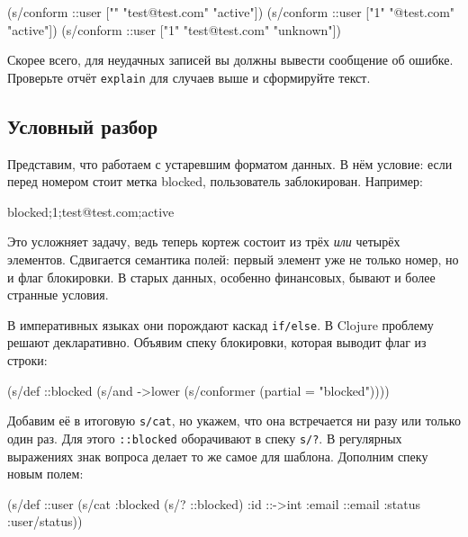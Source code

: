 \else

\begin{english}
  \begin{clojure}
(s/conform ::user ["" "test@test.com" "active"])
(s/conform ::user ["1" "@test.com" "active"])
(s/conform ::user ["1" "test@test.com" "unknown"])
  \end{clojure}
\end{english}

\fi

Скорее всего, для неудачных записей вы должны вывести сообщение об
ошибке. Проверьте отчёт \verb|explain| для случаев выше и сформируйте текст.

\subsection{Условный разбор}

Представим, что работаем с устаревшим форматом данных. В нём условие: если
перед номером стоит метка blocked, пользователь заблокирован. Например:

\begin{english}
  \begin{text}
blocked;1;test@test.com;active
  \end{text}
\end{english}

Это усложняет задачу, ведь теперь кортеж состоит из трёх \emph{или} четырёх
элементов. Сдвигается семантика полей: первый элемент уже не только номер, но и
флаг блокировки. В старых данных, особенно финансовых, бывают и более странные
условия.

В императивных языках они порождают каскад \verb|if/else|. В Clojure проблему
решают декларативно. Объявим спеку блокировки, которая выводит флаг из строки:

\begin{english}
  \begin{clojure}
(s/def ::blocked
  (s/and
   ->lower
   (s/conformer (partial = "blocked"))))
  \end{clojure}
\end{english}


Добавим её в итоговую \verb|s/cat|, но укажем, что она встречается ни разу или
только один раз. Для этого \verb|::blocked| оборачивают в спеку \verb|s/?|.  В
регулярных выражениях знак вопроса делает то же самое для шаблона. Дополним
спеку новым полем:

\begin{english}
  \begin{clojure}
(s/def ::user
  (s/cat :blocked (s/? ::blocked)
         :id ::->int
         :email ::email
         :status :user/status))
  \end{clojure}
\end{english}

